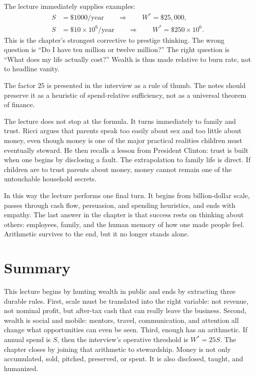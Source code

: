 The lecture immediately supplies examples:
\begin{align}
S &= \$1000/\text{year}
\qquad \Longrightarrow \qquad
W^\ast = \$25{,}000,\\
S &= \$10 \times 10^6/\text{year}
\qquad \Longrightarrow \qquad
W^\ast = \$250 \times 10^6.
\end{align}
This is the chapter's strongest corrective to prestige thinking. The wrong question is ``Do I have ten million or twelve million?'' The right question is ``What does my life actually cost?'' Wealth is thus made relative to burn rate, not to headline vanity.

\begin{remark}
The factor \(25\) is presented in the interview as a rule of thumb. The notes should preserve it as a heuristic of spend-relative sufficiency, not as a universal theorem of finance.
\end{remark}

The lecture does not stop at the formula. It turns immediately to family and trust. Ricci argues that parents speak too easily about sex and too little about money, even though money is one of the major practical realities children must eventually steward. He then recalls a lesson from President Clinton: trust is built when one begins by disclosing a fault. The extrapolation to family life is direct. If children are to trust parents about money, money cannot remain one of the untouchable household secrets.

In this way the lecture performs one final turn. It begins from billion-dollar scale, passes through cash flow, persuasion, and spending heuristics, and ends with empathy. The last answer in the chapter is that success rests on thinking about others: employees, family, and the human memory of how one made people feel. Arithmetic survives to the end, but it no longer stands alone.

\section{Summary}

This lecture begins by hunting wealth in public and ends by extracting three durable rules. First, scale must be translated into the right variable: not revenue, not nominal profit, but after-tax cash that can really leave the business. Second, wealth is social and mobile: mentors, travel, communication, and attention all change what opportunities can even be seen. Third, enough has an arithmetic. If annual spend is \(S\), then the interview's operative threshold is \(W^\ast = 25S\). The chapter closes by joining that arithmetic to stewardship. Money is not only accumulated, sold, pitched, preserved, or spent. It is also disclosed, taught, and humanized.